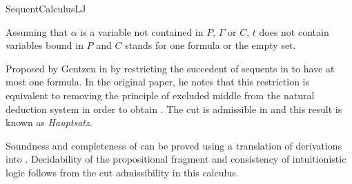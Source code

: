 \begin{entry}{SequentCalculusLJ}
\begin{clarifications}
Assuming that $\alpha$ is a variable not contained in $P$, $\Gamma$ or $C$,
$t$ does not contain variables bound in $P$ and $C$ stands for
one formula or the empty set.
\end{clarifications}

\begin{history}
Proposed by Gentzen in \cite{Gentzen1935} by restricting the
succedent of sequents in  to have at most one
formula. In the original paper, he notes that this restriction is equivalent to
removing the principle of excluded middle from the natural deduction system
 in order to obtain .
The cut is admissible in \LJ and this result is known as \emph{Hauptsatz}.
\end{history}

\begin{technicalities}
Soundness and completeness of \LJ can be proved using a translation of \LJ
derivations into \NJ{}.
Decidability of the propositional fragment and consistency of intuitionistic
logic follows from the cut admissibility in this calculus.
\end{technicalities}







\end{entry}
